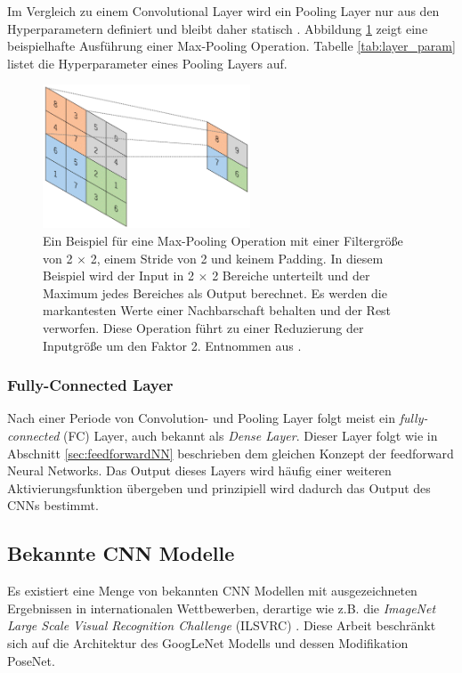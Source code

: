  Im Vergleich zu einem Convolutional Layer wird ein Pooling Layer nur aus den Hyperparametern definiert und bleibt daher statisch \cite{yamashitaConvolutionalNeuralNetworks2018}. Abbildung \ref{fig:pooling_layer} zeigt eine beispielhafte Ausführung einer Max-Pooling Operation. Tabelle \ref{tab:layer_param} listet die Hyperparameter eines Pooling Layers auf.
 \begin{figure}
	\centering
	\includegraphics[width=0.55\textwidth]{images/ann_conv/max_pool.png}
	\caption{Ein Beispiel für eine Max-Pooling Operation mit einer Filtergröße von 2 $\times$ 2, einem Stride von 2 und keinem Padding. In diesem Beispiel wird der Input in 2 $\times$ 2 Bereiche unterteilt und der Maximum jedes Bereiches als Output berechnet. Es werden die markantesten Werte einer Nachbarschaft behalten und der Rest verworfen. Diese Operation führt zu einer Reduzierung der Inputgröße um den Faktor 2. Entnommen aus \cite{yamashitaConvolutionalNeuralNetworks2018}.}
	\label{fig:pooling_layer}
\end{figure}



\subsubsection{Fully-Connected Layer}
Nach einer Periode von Convolution- und Pooling Layer folgt meist ein \textit{fully-connected} (FC) Layer, auch bekannt als \textit{Dense Layer}. Dieser Layer folgt wie in Abschnitt \ref{sec:feedforwardNN} beschrieben dem gleichen Konzept der feedforward Neural Networks. Das Output dieses Layers wird häufig einer weiteren Aktivierungsfunktion übergeben \cite{yamashitaConvolutionalNeuralNetworks2018} und prinzipiell wird dadurch das Output des CNNs bestimmt.

\subsection{Bekannte CNN Modelle}
Es existiert eine Menge von bekannten CNN Modellen mit ausgezeichneten Ergebnissen in internationalen Wettbewerben, derartige wie z.B. die \textit{ImageNet Large Scale Visual Recognition Challenge} (ILSVRC) \cite{russakovskyImageNetLargeScale2015}. Diese Arbeit beschränkt sich auf die Architektur des GoogLeNet Modells und dessen Modifikation PoseNet.

